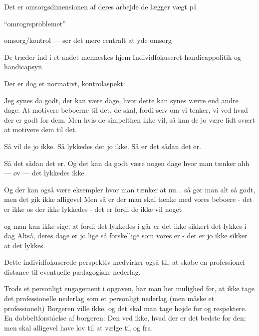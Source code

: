Det er omsorgsdimensionen af deres arbejde de lægger vægt på

“omrogrsproblemet” \autocite[s.455ff]{hansbolKonstruktionAfProfessionel2008}

omsorg/kontrol — ser det mere centralt at yde omsorg \autocite[s.??]{frederiksenVelfaerdsprofessionerMellemOmsorg2017}

De træder ind i et andet menneskes hjem \autocite[§ ??]{social-ogindenrigsministerietBekendtgorelseAfLov2019}
Individfokuseret handicappolitik og handicapsyn \autocite{langagerDetAfmalteLiv2013, hurFrigorelsensMagt2015}

Der er dog et normativt, kontrolaspekt:
\begin{description}
\AMB
Jeg synes da godt, der kan være dage, hvor dette kan synes værre end andre dage.
At motivere beboerne til det, de skal, fordi selv om vi tenker, vi ved hvad der er godt for dem.
Men hvis de simpelthen ikke vil, så kan de jo være lidt svært at motivere dem til det.

\DMC
Så vil de jo ikke.
Så lykkedes det jo ikke.
Så er det sådan det er.

\AMB
Så det sådan det er.
Og det kan da godt være nogen dage hvor man tænker ahh — øv — det lykkedes ikke.

\DMC
Og der kan også være eksempler hvor man tænker at nu... så gør man alt så godt, men det gik ikke alligevel
Men så er der man skal tænke med vores beboere - det er ikke os der ikke lykkedes - det er fordi de ikke vil noget 

\AMB
og man kan ikke sige, at fordi det lykkedes i går er det ikke sikkert det lykkes i dag
Altså, deres dage er jo lige så forskellige som vores er - det er jo ikke sikker at det lykkes.
\end{description}

Dette individfokuserede perspektiv medvirker også til, at skabe en professionel distance til eventuelle pædagogiske nederlag.

Trods et personligt engagement i opgaven, har man her mulighed for, at ikke tage det professionelle nederlag som et personligt nederlag (men måske et professionelt)
Borgeren ville ikke, og det skal man tage højde for og respektere.
En dobbeltforståelse af borgeren: Den ved ikke, hvad der er det bedste for den; men skal alligevel have lov til at vælge til og fra. 

